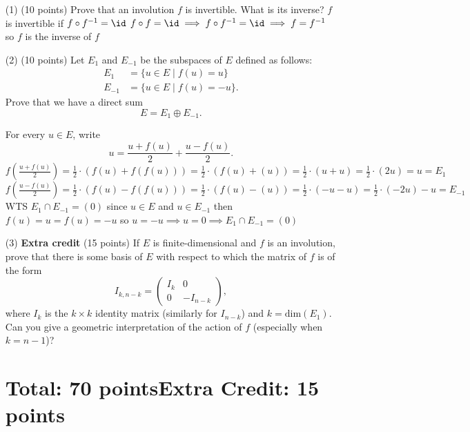 \documentclass[12pt]{article}
\begin{document}
\begin{itemize}
\item[(1)](10 points)
Prove that an  involution $f$ is invertible. What is its inverse?
\newline $f$ is invertible if $f\circ f^{-1}= \id $
\newline $f\circ f = \id \implies f\circ f^{-1} = \id \implies f=f^{-1}$
\newline so $f$ is the inverse of $f$
\item[(2)](10 points)
Let $E_1$ and $E_{-1}$ be the subspaces of $E$ defined as follows:
\begin{align*}
E_1 & = \{u \in E \mid f(u) = u\} \\
E_{-1} & = \{u \in E \mid f(u) = -u\}.
\end{align*}
Prove that we have a direct sum
\[
E = E_{1} \oplus E_{-1}.
\]

\hint
For every $u\in E$, write
\[
u = \frac{u + f(u)}{2} + \frac{u - f(u)}{2}. 
\]
$f(\frac{u + f(u)}{2})=\frac{1}{2}\cdot (f(u)+f(f(u)))=\frac{1}{2}\cdot (f(u)+(u))=\frac{1}{2}\cdot (u+u)=\frac{1}{2}\cdot (2u)=u=E_1$
\newline $f(\frac{u - f(u)}{2})=\frac{1}{2}\cdot (f(u)-f(f(u)))=\frac{1}{2}\cdot (f(u)-(u))=\frac{1}{2}\cdot (-u-u)=\frac{1}{2}\cdot (-2u)-u=E_{-1}$
\newline
\newline WTS $E_1 \cap E_{-1}=(0)$
\newline
\newline since $u \in E$ and $u \in E_{-1}$
\newline then $f(u)=u=f(u)=-u$
\newline so $u=-u \implies u=0 \implies E_1 \cap E_{-1}=(0)$


\item[(3)]{ \bf Extra credit }(15 points)
If $E$ is finite-dimensional and $f$ is an involution, prove that
there is some basis of $E$ with respect to which the matrix of $f$ is of the form
\[
I_{k , n - k} =
\begin{pmatrix}
I_k & 0 \\
0 & - I_{n - k}
\end{pmatrix},
\]
where $I_k$ is the $k\times k$ identity matrix 
(similarly for $I_{n -  k}$) and $k = \mathrm{dim}(E_1)$.
Can you give a geometric interpretation of the action of $f$
(especially when   $k = n - 1$)?

\section*{Total: 70 points\qquad Extra Credit: 15 points}
\end{itemize}
\end{document}

